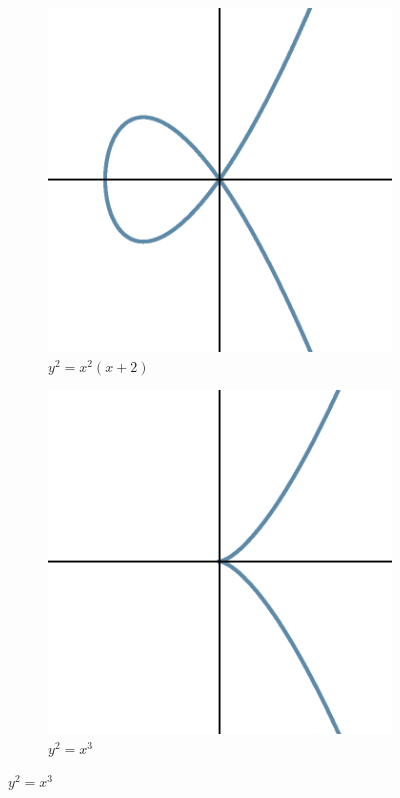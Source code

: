 \begin{frame}[plain]
	\begin{figure}
	\centering
	\begin{subfigure}{0.45\textwidth}
	\includegraphics[width=\textwidth]{images/ec3.eps}
	\caption*{$y^2=x^2(x+2)$}
	\end{subfigure}
	\begin{subfigure}{0.45\textwidth}
	\includegraphics[width=\textwidth]{images/ec4.eps}
	\caption*{$y^2= x^3$}
	\end{subfigure}
	\end{figure}
\end{frame}



